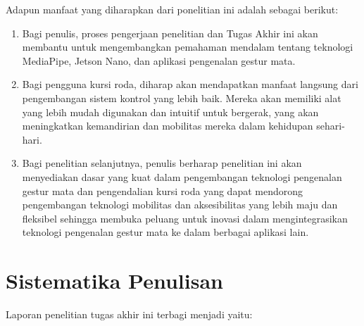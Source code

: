 
Adapun manfaat yang diharapkan dari ponelitian ini adalah sebagai berikut:

\begin{enumerate}[nolistsep]

  \item Bagi penulis, proses pengerjaan penelitian dan Tugas Akhir ini akan membantu untuk mengembangkan pemahaman mendalam tentang teknologi MediaPipe, Jetson Nano, dan aplikasi pengenalan gestur mata.
  \item Bagi pengguna kursi roda, diharap akan mendapatkan manfaat langsung dari pengembangan sistem kontrol yang lebih baik. Mereka akan memiliki alat yang lebih mudah digunakan dan intuitif untuk bergerak, yang akan meningkatkan kemandirian dan mobilitas mereka dalam kehidupan sehari-hari.
  \item Bagi penelitian selanjutnya, penulis berharap penelitian ini akan menyediakan dasar yang kuat dalam pengembangan teknologi pengenalan gestur mata dan pengendalian kursi roda yang dapat mendorong pengembangan teknologi mobilitas dan aksesibilitas yang lebih maju dan fleksibel sehingga membuka peluang untuk inovasi dalam mengintegrasikan teknologi pengenalan gestur mata ke dalam berbagai aplikasi lain.

\end{enumerate}

\section{Sistematika Penulisan}
\label{sec:sistematikapenulisan}

Laporan penelitian tugas akhir ini terbagi menjadi \lipsum[1][1-3] yaitu:

